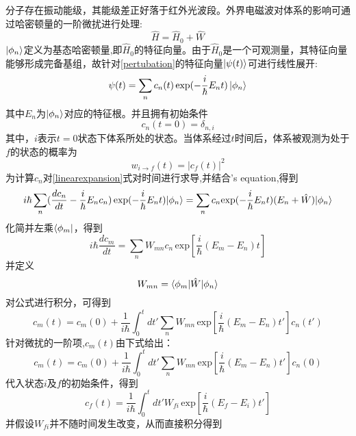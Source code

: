 \begin{description}
	分子存在振动能级，其能级差正好落于红外光波段。外界电磁波对体系的影响可通过哈密顿量的一阶微扰进行处理:
\begin{equation}
\hat{H}=\hat{H}_0 + \hat{W}
\label{pertubation}
\end{equation}
$| \phi_n \rangle$定义为基态哈密顿量,即$\hat{H}_0$的特征向量。由于$\hat{H}_0$是一个可观测量，其特征向量能够形成完备基组，故针对\ref{pertubation}的特征向量$| \psi(t) \rangle$可进行线性展开:
\begin{equation}
\psi(t)=\sum_nc_n(t)\,\mathrm{exp}(-\frac{i}{\hbar}E_nt)\,| \phi_n \rangle
\label{linearexpansion}
\end{equation}
其中$E_n$为$| \phi_n \rangle$对应的特征根。并且拥有初始条件
\begin{equation}
c_n(t=0)=\delta_{n,i}
\end{equation}
其中，$i$表示$t=0$状态下体系所处的状态。当体系经过$t$时间后，体系被观测为处于$f$的状态的概率为
\begin{equation}
w_{i\rightarrow f}(t)=|c_f(t)|^2
\end{equation}
为计算$c_n$对\ref{linearexpansion}式对时间进行求导,并结合\sch's equation,得到
\begin{equation}
i\hbar\sum_n(\frac{dc_n}{dt}-\frac{i}{\hbar}E_nc_n)\,\mathrm{exp}(-\frac{i}{\hbar}E_nt)| \phi_n \rangle=\sum_nc_n\mathrm{exp}(-\frac{i}{\hbar}E_nt)(E_n+\hat{W})| \phi_n \rangle
\end{equation}
化简并左乘$\langle \phi_m |$，得到
\begin{equation}
i\hbar\frac{dc_m}{dt}=\sum_nW_{mn}c_n\,\mathrm{exp}[\frac{i}{\hbar}(E_m-E_n)t]
\end{equation}
并定义
\begin{equation}
W_{mn}=\langle \phi_m | \hat{W} | \phi_n \rangle
\end{equation}
对公式进行积分，可得到
\begin{equation}
c_m(t)=c_m(0)+\frac{1}{i\hbar}\int^t_0dt'\sum_nW_{mn}\,\mathrm{exp}[\frac{i}{\hbar}(E_m-E_n)t']c_n(t')
\end{equation}
针对微扰的一阶项,$c_m(t)$由下式给出：
\begin{equation}
c_m(t)=c_m(0)+\frac{1}{i\hbar}\int^t_0dt'\sum_nW_{mn}\,\mathrm{exp}[\frac{i}{\hbar}(E_m-E_n)t']c_n(0)
\end{equation}
代入状态$i$及$f$的初始条件，得到
\begin{equation}
c_f(t)=\frac{1}{i\hbar}\int^t_0dt'W_{fi}\,\mathrm{exp}[\frac{i}{\hbar}(E_f-E_i)t']
\end{equation}
并假设$W_{fi}$并不随时间发生改变，从而直接积分得到
\begin{equation}

\end{equation}
\end{description}
